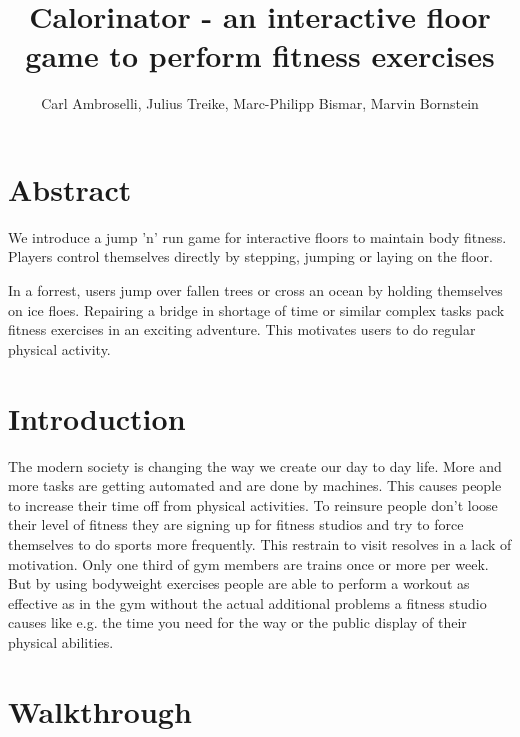 \documentclass[twocolumn,showpacs,%
  nofootinbib,aps,superscriptaddress,%
  eqsecnum,prd,notitlepage,showkeys,10pt]{revtex4-1}
\newcommand*{\TitleFont}{%
      \usefont{\encodingdefault}{\rmdefault}{b}{n}%
      \fontsize{16}{20}%
      \selectfont}
\begin{document}
\title{\TitleFont Calorinator - an interactive floor game to perform fitness exercises}
\author{Carl Ambroselli, Julius Treike, Marc-Philipp Bismar, Marvin Bornstein}


\maketitle

\section{Abstract}

We introduce a jump 'n' run game for interactive floors to maintain body fitness. Players control themselves directly by stepping, jumping or laying on the   floor.

In a forrest, users jump over fallen trees or cross an ocean by holding themselves on ice floes. Repairing a bridge in shortage of time or similar complex    tasks pack fitness exercises in an exciting adventure. This motivates users to do regular physical activity.

\section{Introduction}

The modern society is changing the way we create our day to day life. More and more tasks are getting automated and are done by machines. This causes people to increase their time off from physical activities.
To reinsure people don’t loose their level of fitness they are signing up for fitness studios and try to force themselves to do sports more frequently.  This restrain to visit resolves in a lack of motivation. Only one third of gym members are trains once or more per week.
But by using bodyweight exercises people are able to perform a workout as effective as in the gym without the actual additional problems a fitness studio causes like e.g. the time you need for the way or the public display of their physical abilities.

\section{Walkthrough}
\end{document}
